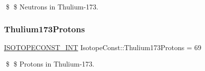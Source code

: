 \$ \$ Neutrons in Thulium-\/173. \mbox{\label{group___isotope_const-_thulium-_tm173_gab4f5866e05c2508376317e7c01800d8a}} 
\subsubsection{\texorpdfstring{Thulium173\+Protons}{Thulium173Protons}}
{\footnotesize\ttfamily \mbox{\hyperlink{group___isotope_const-_macros_ga5f18360b3e99483a35c32d789e62621c}{I\+S\+O\+T\+O\+P\+E\+C\+O\+N\+S\+T\+\_\+\+I\+NT}} Isotope\+Const\+::\+Thulium173\+Protons = 69}

\$ \$ Protons in Thulium-\/173. 
